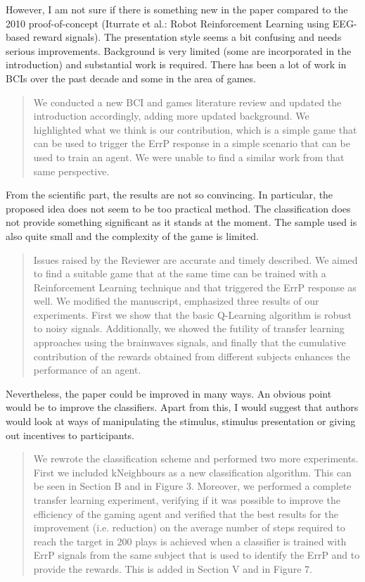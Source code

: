 \documentclass[journal,onecolumn,12pt]{IEEEtran}
\begin{document}
However, I am not sure if there is something new in the paper compared to the 2010 proof-of-concept (Iturrate et al.: Robot Reinforcement Learning using EEG-based reward signals). The presentation style seems a bit confusing and needs serious improvements. Background is very limited (some are incorporated in the introduction) and substantial work is required. There has been a lot of work in BCIs over the past decade and some in the area of games.

\begin{quotation}
{\color{blue}
We conducted a new BCI and games literature review and updated the introduction accordingly, adding more updated background.  We highlighted what we think is our contribution, which is a simple game that can be used to trigger the ErrP response in a simple scenario that can be used to train an agent.  We were unable to find a similar work from that same perspective.  
}
\end{quotation}


From the scientific part, the results are not so convincing. In particular, the proposed idea does not seem to be too practical method. The classification does not provide something significant as it stands at the moment. The sample used is also quite small and the complexity of the game is limited.

\begin{quotation}
{\color{blue}
Issues raised by the Reviewer are accurate and timely described.  We aimed to find a suitable game that at the same time can be trained with a Reinforcement Learning technique and that triggered the ErrP response as well.  We modified the manuscript, emphasized three results of our experiments.  First we show that the basic Q-Learning algorithm is robust to noisy signals.  Additionally,  we showed the futility of transfer learning approaches using the brainwaves signals, and finally that the cumulative contribution of the rewards obtained from different subjects enhances the performance of an agent.
}
\end{quotation}


Nevertheless, the paper could be improved in many ways. An obvious point would be to improve the classifiers. Apart from this, I would suggest that authors would look at ways of manipulating the stimulus, stimulus presentation or giving out incentives to participants.

\begin{quotation}
{\color{blue}
We rewrote the classification scheme and performed two more experiments.  First we included kNeighbours as a new classification algorithm.  This can be seen in Section B and in Figure 3.  Moreover, we performed a complete transfer learning experiment, verifying if it was possible to improve the efficiency of the gaming agent  and verified that the best results for the improvement (i.e. reduction) on the average number of steps required to reach the target in 200 plays is achieved when a classifier is trained with ErrP signals from the same subject that is used to identify the ErrP and to provide the rewards.    This is added in Section V and in Figure 7.
}
\end{quotation}
\end{document}
